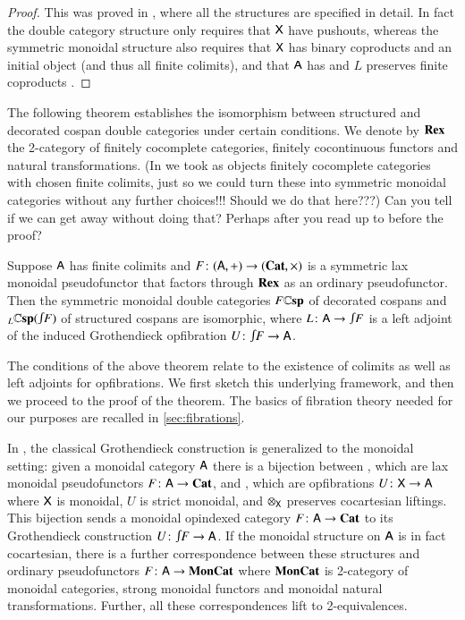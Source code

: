 \documentclass[reqno]{amsart}
\begin{document}
\begin{proof}
This was proved in \cite[Theorems~2.3 \& 3.9]{BC2}, where all the structures are specified in detail. In fact the double category structure only requires that $\mathsf{X}$ have pushouts, whereas the symmetric monoidal structure also requires that $\mathsf{X}$ has binary coproducts and an initial object (and thus all finite colimits), and that $\mathsf{A}$ has and $L$ preserves finite coproducts \cite[Theorem~3.2.3]{CourserThesis}.
\end{proof}

The following theorem establishes the isomorphism between structured and decorated cospan double categories under certain conditions.  We denote by $\mathbf{Rex}$ the 2-category of finitely cocomplete categories, finitely cocontinuous functors and natural transformations.   (In \cite{BC} we took as objects finitely cocomplete categories with chosen finite colimits, just so we could turn these into symmetric monoidal categories without any further choices!!!  Should we do that here???) {\chris Can you tell if we can get away without doing that? Perhaps after you read up to before the proof?}

\begin{thm} \label{thm:equiv}
Suppose $\mathsf{A}$ has finite colimits and $F \colon (\mathsf{A},+) \to (\mathbf{Cat},\times)$ is a symmetric lax monoidal pseudofunctor that factors through $\mathbf{Rex}$ as an ordinary pseudofunctor. Then the symmetric monoidal double categories $F\mathbf{\mathbb Csp}$ of decorated cospans and $_L\lCsp(\inta F)$ of structured cospans are isomorphic, where $L \maps \A \to \inta F$ is a left adjoint of the induced Grothendieck opfibration $U\maps \inta F \to \A$.
\end{thm}

The conditions of the above theorem relate to the existence of colimits as well as left adjoints for opfibrations. We first sketch this underlying framework, and then we proceed to the proof of the theorem. The basics of fibration theory needed for our purposes are recalled in \cref{sec:fibrations}. 

In \cite{MV}, the classical Grothendieck construction is generalized to the monoidal setting: given a monoidal category $\mathsf{A}$ there is a bijection between , which are lax monoidal pseudofunctors $F\colon\mathsf{A}\to\mathbf{Cat}$, and , which are opfibrations $U \colon \mathsf{X} \to \mathsf{A}$ where $\mathsf{X}$ is monoidal, $U$ is strict monoidal, and $\otimes_{\mathsf{X}}$ preserves cocartesian liftings.   This bijection sends a monoidal opindexed category $F \colon \mathsf{A} \to \mathbf{Cat}$ to its Grothendieck construction $U \maps \inta F \to \A$.  If the monoidal structure on $\mathsf{A}$ is in fact cocartesian, there is a further correspondence between these structures and ordinary pseudofunctors $F\colon\mathsf{A}\to\mathbf{MonCat}$ where $\mathbf{MonCat}$ is 2-category of monoidal categories, strong monoidal functors and monoidal natural transformations.   Further, all these correspondences lift to 2-equivalences.
\end{document}

